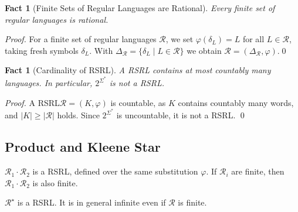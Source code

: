 \documentclass[envcountsame]{llncs}
\newcommand{\rationalset}{\ensuremath{\mathcal{R}}\xspace}
\newcommand{\RegularlyGeneratedLanguageSetAbbrev}{RSRL\xspace}
\newcommand{\RegularlyGeneratedLanguageSetsTitleAbbrev}{RSRL\xspace}
\newcommand{\ARegularlyGeneratedLanguageSet}{rational\xspace}
\newcommand{\ARegularlyGeneratedLanguageSetTitle}{Rational\xspace}
\newtheorem{fact}[theorem]{Fact}
\begin{document}
\begin{fact}[Finite Sets of Regular Languages are \ARegularlyGeneratedLanguageSetTitle]
  \label{fact:finite-regular-sets-are-rational}
  Every finite set of regular languages is \ARegularlyGeneratedLanguageSet. 
\end{fact}

\begin{proof}
  For a finite set of regular languages $\rationalset$, we set
  $\varphi(\delta_L)=L$ for all $L\in\rationalset$, taking fresh
  symbols $\delta_L$.
With $\Delta_\rationalset=\{\delta_L\mid L\in\rationalset\}$ we
  obtain $\rationalset=(\Delta_\rationalset,\varphi)$.\qed
\end{proof}


\begin{fact}[Cardinality of \RegularlyGeneratedLanguageSetsTitleAbbrev]
  \label{fact:rational-sets-cardinality}
  A \RegularlyGeneratedLanguageSetAbbrev contains at most countably many languages. In
  particular, $2^{\Sigma^*}$ is not a \RegularlyGeneratedLanguageSetAbbrev. 
\end{fact}

\begin{proof}
  A \RegularlyGeneratedLanguageSetAbbrev $\rationalset = (K, \varphi)$ is countable, as $K$
  contains countably many words, and $|K|\ge |\rationalset|$ holds.
Since $2^{\Sigma^*}$ is uncountable, it is not a \RegularlyGeneratedLanguageSetAbbrev. \qed
\end{proof}



\subsection{Product and Kleene Star}
\label{sec:product-kleene-star}



\begin{proposition}
  \label{prop:closure:product-kleene}
  \begin{inparaenum}
  \item $\rationalset_1 \cdot \rationalset_2$ is a \RegularlyGeneratedLanguageSetAbbrev,
    defined over the same substitution $\varphi$. If $\rationalset_i$
    are finite, then $\rationalset_1 \cdot \rationalset_2$ is also
    finite.
  \item $\rationalset^\star$ is a \RegularlyGeneratedLanguageSetAbbrev.
It is in general infinite even if $\rationalset$ is finite.
  \end{inparaenum}
\end{proposition}
\end{document}

